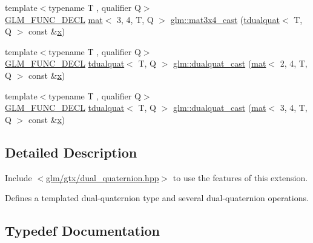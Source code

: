 \begin{DoxyCompactItemize}
\item 
{\footnotesize template$<$typename T , qualifier Q$>$ }\\\hyperlink{setup_8hpp_ab2d052de21a70539923e9bcbf6e83a51}{G\+L\+M\+\_\+\+F\+U\+N\+C\+\_\+\+D\+E\+CL} \hyperlink{structglm_1_1mat}{mat}$<$ 3, 4, T, Q $>$ \hyperlink{group__gtx__dual__quaternion_gaf59f5bb69620d2891c3795c6f2639179}{glm\+::mat3x4\+\_\+cast} (\hyperlink{structglm_1_1tdualquat}{tdualquat}$<$ T, Q $>$ const \&\hyperlink{_s_d_l__opengl_8h_ad0e63d0edcdbd3d79554076bf309fd47}{x})
\item 
{\footnotesize template$<$typename T , qualifier Q$>$ }\\\hyperlink{setup_8hpp_ab2d052de21a70539923e9bcbf6e83a51}{G\+L\+M\+\_\+\+F\+U\+N\+C\+\_\+\+D\+E\+CL} \hyperlink{structglm_1_1tdualquat}{tdualquat}$<$ T, Q $>$ \hyperlink{group__gtx__dual__quaternion_gac4064ff813759740201765350eac4236}{glm\+::dualquat\+\_\+cast} (\hyperlink{structglm_1_1mat}{mat}$<$ 2, 4, T, Q $>$ const \&\hyperlink{_s_d_l__opengl_8h_ad0e63d0edcdbd3d79554076bf309fd47}{x})
\item 
{\footnotesize template$<$typename T , qualifier Q$>$ }\\\hyperlink{setup_8hpp_ab2d052de21a70539923e9bcbf6e83a51}{G\+L\+M\+\_\+\+F\+U\+N\+C\+\_\+\+D\+E\+CL} \hyperlink{structglm_1_1tdualquat}{tdualquat}$<$ T, Q $>$ \hyperlink{group__gtx__dual__quaternion_ga91025ebdca0f4ea54da08497b00e8c84}{glm\+::dualquat\+\_\+cast} (\hyperlink{structglm_1_1mat}{mat}$<$ 3, 4, T, Q $>$ const \&\hyperlink{_s_d_l__opengl_8h_ad0e63d0edcdbd3d79554076bf309fd47}{x})
\end{DoxyCompactItemize}


\subsection{Detailed Description}
Include $<$\hyperlink{dual__quaternion_8hpp}{glm/gtx/dual\+\_\+quaternion.\+hpp}$>$ to use the features of this extension.

Defines a templated dual-\/quaternion type and several dual-\/quaternion operations. 

\subsection{Typedef Documentation}
\mbox{\label{group__gtx__dual__quaternion_ga373431ffdd82d5c03c258217a9e1f1a6}} 
